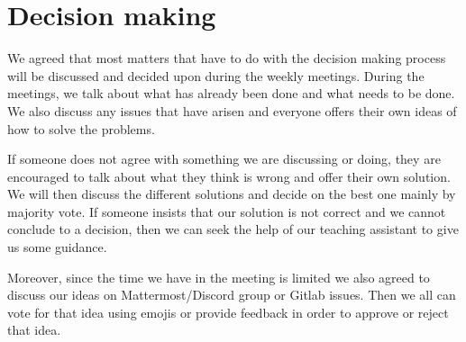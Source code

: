 \section{Decision making}

We agreed that most matters that have to do with the decision making process will be discussed and decided upon during the weekly meetings.
During the meetings, we talk about what has already been done and what needs to be done.
We also discuss any issues that have arisen and everyone offers their own ideas of how to solve the problems.

If someone does not agree with something we are discussing or doing, they are encouraged to talk about what they think is wrong and offer their own solution.
We will then discuss the different solutions and decide on the best one mainly by majority vote.
If someone insists that our solution is not correct and we cannot conclude to a decision,
then we can seek the help of our teaching assistant to give us some guidance.

Moreover, since the time we have in the meeting is limited we also agreed to discuss our ideas on Mattermost/Discord group or Gitlab issues.
Then we all can vote for that idea using emojis or provide feedback in order to approve or reject that idea.
